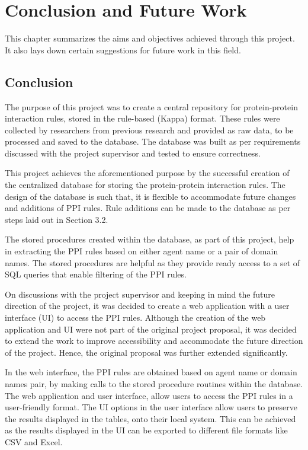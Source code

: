 \documentclass[msc,deptreport,ai]{infthesis}      %
\begin{document}
\chapter{Conclusion and Future Work}
This chapter summarizes the aims and objectives achieved through this project. It also lays down certain suggestions for future work in this field.

\section{Conclusion}
The purpose of this project was to create a central repository for protein-protein interaction rules, stored in the rule-based (Kappa) format. These rules were collected by researchers from previous research and provided as raw data, to be processed and saved to the database. The database was built as per requirements discussed with the project supervisor and tested to ensure correctness. 

This project achieves the aforementioned purpose by the successful creation of the centralized database for storing the protein-protein interaction rules. The design of the database is such that, it is flexible to accommodate future changes and additions of PPI rules. Rule additions can be made to the database as per steps laid out in Section 3.2.

The stored procedures created within the database, as part of this project, help in extracting the PPI rules based on either agent name or a pair of domain names. The stored procedures are helpful as they provide ready access to a set of SQL queries that enable filtering of the PPI rules. 

On discussions with the project supervisor and keeping in mind the future direction of the project, it was decided to create a web application with a user interface (UI) to access the PPI rules. Although the creation of the web application and UI were not part of the original project proposal, it was decided to extend the work to improve accessibility and accommodate the future direction of the project. Hence, the original proposal was further extended significantly.

In the web interface, the PPI rules are obtained based on agent name or domain names pair, by making calls to the stored procedure routines within the database. The web application and user interface, allow users to access the PPI rules in a user-friendly format. The UI options in the user interface allow users to preserve the results displayed in the tables, onto their local system. This can be achieved as the results displayed in the UI can be exported to different file formats like CSV and Excel.  
\end{document}
